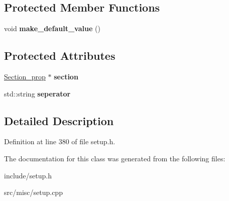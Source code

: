 \subsection*{Protected Member Functions}
\begin{DoxyCompactItemize}
\item 
\hypertarget{classProp__multival_a0a894a156a00f00d82f119a415619498}{void {\bfseries make\-\_\-default\-\_\-value} ()}\label{classProp__multival_a0a894a156a00f00d82f119a415619498}

\end{DoxyCompactItemize}
\subsection*{Protected Attributes}
\begin{DoxyCompactItemize}
\item 
\hypertarget{classProp__multival_a81ace37ba9062aea3513ddb30ccba50d}{\hyperlink{classSection__prop}{Section\-\_\-prop} $\ast$ {\bfseries section}}\label{classProp__multival_a81ace37ba9062aea3513ddb30ccba50d}

\item 
\hypertarget{classProp__multival_a507b96adb6fb9aafdec560cacff2d2ad}{std\-::string {\bfseries seperator}}\label{classProp__multival_a507b96adb6fb9aafdec560cacff2d2ad}

\end{DoxyCompactItemize}


\subsection{Detailed Description}


Definition at line 380 of file setup.\-h.



The documentation for this class was generated from the following files\-:\begin{DoxyCompactItemize}
\item 
include/setup.\-h\item 
src/misc/setup.\-cpp\end{DoxyCompactItemize}
